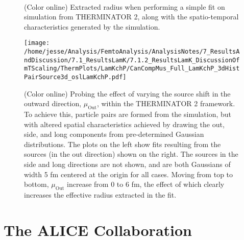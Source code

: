 \documentclass[ALICE,manyauthors]{cernphprep}
\begin{document}
\begin{figure}[h!]
  \centering
   \\
  \caption[Extracted Radius and Pair Sources from THERMINATOR 2]
  {
  (Color online) Extracted radius when performing a simple fit on simulation from THERMINATOR 2, along with the spatio-temporal characteristics generated by the simulation.
  }
  \label{fig:LamKchP_StdThermSources}
\end{figure}



\begin{figure}[h]
  \centering
  \texttt{[image: /home/jesse/Analysis/FemtoAnalysis/AnalysisNotes/7\_ResultsAndDiscussion/7.1\_ResultsLamK/7.1.2\_ResultsLamK\_DiscussionOfmTScaling/ThermPlots/LamKchP/CanCompMus\_Full\_LamKchP\_3dHistPairSource3d\_oslLamKchP.pdf]}
  \caption[Varying $\mu_{\mathrm{Out}}$ with THERMINATOR 2]
  {
  (Color online) Probing the effect of varying the source shift in the outward direction, $\mu_{\mathrm{Out}}$, within the THERMINATOR 2 framework.  
  To achieve this, particle pairs are formed from the simulation, but with altered spatial characteristics achieved by drawing the out, side, and long components from pre-determined Gaussian distributions.  
  The plots on the left show fits resulting from the sources (in the out direction) shown on the right.  
  The sources in the side and long directions are not shown, and are both Gaussians of width 5 fm centered at the origin for all cases.  
  Moving from top to bottom, $\mu_{\mathrm{Out}}$ increase from 0 to 6 fm, the effect of which clearly increases the effective radius extracted in the fit.
  }
  \label{fig:LamKchP_ThermSources_VaryMuOut}
\end{figure}

\clearpage



\section{The ALICE Collaboration}
\label{app:collab}
\end{document}
